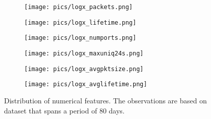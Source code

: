 \documentclass[manuscript, nonacm]{acmart}
\begin{document}
\begin{figure*}
\centering
\begin{subfigure}[b]{.3\linewidth}
\texttt{[image: pics/logx\_packets.png]}
\end{subfigure}
\begin{subfigure}[b]{.3\linewidth}
\texttt{[image: pics/logx\_lifetime.png]}
\end{subfigure}
\begin{subfigure}[b]{.3\linewidth}
\texttt{[image: pics/logx\_numports.png]}
\end{subfigure}
\begin{subfigure}[b]{.3\linewidth}
\texttt{[image: pics/logx\_maxuniq24s.png]}
\end{subfigure}
\begin{subfigure}[b]{.3\linewidth}
\texttt{[image: pics/logx\_avgpktsize.png]}
\end{subfigure}
\begin{subfigure}[b]{.3\linewidth}
\texttt{[image: pics/logx\_avglifetime.png]}
\end{subfigure}
\caption{Distribution of numerical features. The observations are based on dataset that spans a period of 80 days.}
\label{fig:cdf}
\end{figure*}


\end{document}
